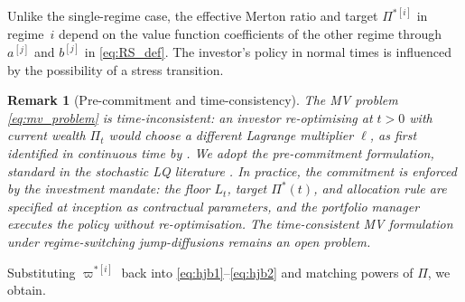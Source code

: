 \documentclass[11pt,a4paper]{article}
\numberwithin{equation}{section}
\newtheorem{remark}[theorem]{Remark}
\begin{document}
Unlike the single-regime case, the effective Merton ratio and target $\Pi^{*[i]}$ in regime~$i$ depend on the value function coefficients of the other regime through $a^{[j]}$ and $b^{[j]}$ in \eqref{eq:RS_def}. The investor's policy in normal times is influenced by the possibility of a stress transition.


\begin{remark}[Pre-commitment and time-consistency]%
\label{rem:time_consistency}
The MV problem \eqref{eq:mv_problem} is time-inconsistent: an investor 
re-optimising at $t > 0$ with current wealth $\Pi_t$ would choose a 
different Lagrange multiplier $\ell$, as first identified in continuous 
time by \citet{BasakChabakauri2010}. We adopt the pre-commitment 
formulation, standard in the stochastic LQ literature 
\citep{ZhouLi2000, ZhouYin2003, ShiXu2025}. In practice, the 
commitment is enforced by the investment mandate: the floor $L_t$, 
target $\Pi^*(t)$, and allocation rule are specified at inception as 
contractual parameters, and the portfolio manager executes the policy 
without re-optimisation. The time-consistent MV formulation under 
regime-switching jump-diffusions remains an open problem.
\end{remark}


Substituting $\varpi^{*[i]}$ back into \eqref{eq:hjb1}--\eqref{eq:hjb2} and matching powers of $\Pi$, we obtain.
\end{document}
